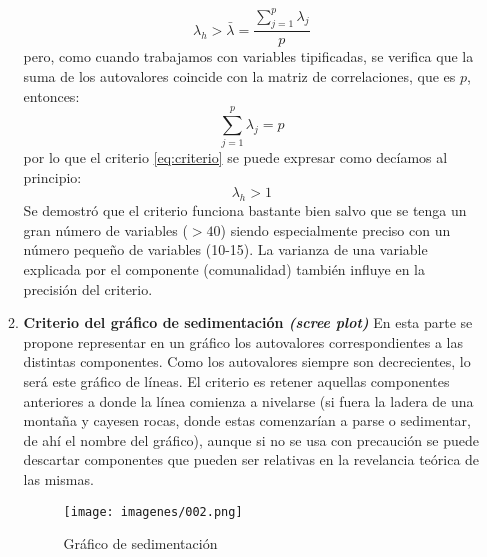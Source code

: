 \begin{enumerate}
\begin{enumerate}
        \begin{equation}
            \lambda_h>\bar{\lambda}=\frac{\sum\limits_{j = 1}^{p}\lambda_j}{p}
            \label{eq:criterio}   
        \end{equation} 
        pero, como cuando trabajamos con variables tipificadas, se verifica que la suma de los autovalores coincide con la matriz de correlaciones, que es $p$, entonces:
        \begin{equation}
            \sum\limits_{j = 1}^{p}\lambda_j=p
        \end{equation}
        por lo que el criterio \eqref{eq:criterio} se puede expresar como decíamos al principio:
        \begin{equation}
            \lambda_h>1
        \end{equation}
        Se demostró que el criterio funciona bastante bien salvo que se tenga un gran número de variables ($>40$) siendo especialmente preciso con un número pequeño de variables (10-15). La varianza de una variable explicada por el componente (comunalidad) también influye en la precisión del criterio.

        \item \textbf{Criterio del gráfico de sedimentación \textsl{(scree plot)}} En esta parte se propone representar en un gráfico los autovalores correspondientes a las distintas componentes. Como los autovalores siempre son decrecientes, lo será este gráfico de líneas. El criterio es retener aquellas componentes anteriores a donde la línea comienza a nivelarse (si fuera la ladera de una montaña y cayesen rocas, donde estas comenzarían a parse o sedimentar, de ahí el nombre del gráfico), aunque si no se usa con precaución se puede descartar componentes que pueden ser relativas en la revelancia teórica de las mismas.
        \begin{figure}[htb]
        \centering
        \texttt{[image: imagenes/002.png]}
        \caption{Gráfico de sedimentación \citep{aldas2017analisis}}
        \label{fig:sedimentacion2}
        \end{figure}


\end{enumerate}
\end{enumerate}
